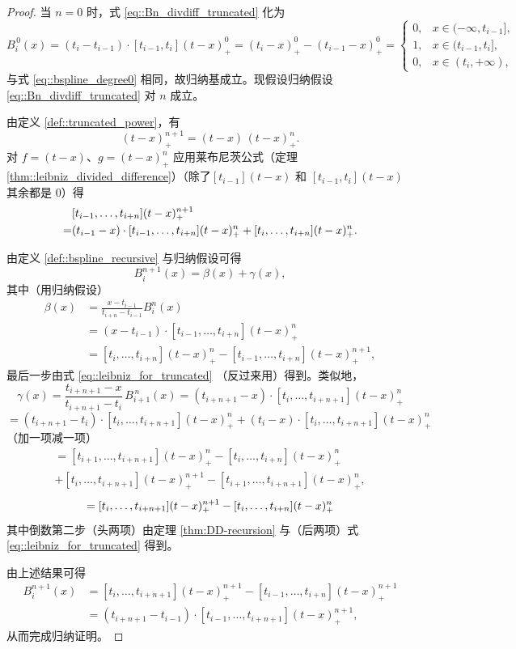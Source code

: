 \documentclass[a4paper]{ctexart}
\numberwithin{theorem}{section}
\numberwithin{equation}{section}
\numberwithin{figure}{section}
\numberwithin{remark}{section}
\begin{document}
\begin{proof}
当 $n=0$ 时，式 \eqref{eq::Bn_divdiff_truncated} 化为
\[
B^{\,0}_i(x)=(t_i-t_{i-1})\cdot [t_{i-1},t_i](t-x)^{0}_{+}
=(t_i-x)^{0}_{+}-(t_{i-1}-x)^{0}_{+}
=\begin{cases}
0, & x\in(-\infty,t_{i-1}],\\
1, & x\in(t_{i-1},t_i],\\
0, & x\in(t_i,+\infty),
\end{cases}
\]
与式 \eqref{eq::bspline_degree0} 相同，故归纳基成立。现假设归纳假设 \eqref{eq::Bn_divdiff_truncated} 对 $n$ 成立。

由定义 \ref{def::truncated_power}，有
\[
(t-x)^{n+1}_{+}=(t-x)\,(t-x)^{n}_{+}.
\]
对 $f=(t-x)$、$g=(t-x)^{n}_{+}$ 应用莱布尼茨公式（定理 \ref{thm::leibniz_divided_difference}）（除了$[t_{i-1}](t - x)$ 和 $[t_{i - 1}, t_i](t - x)$ 其余都是 $0$）得
\begin{equation}
\label{eq::leibniz_for_truncated}
\begin{aligned}
&\relax [t_{i-1},\ldots,t_{i+n}](t-x)^{n+1}_{+} \\
=&(t_{i-1}-x)\cdot [t_{i-1},\ldots,t_{i+n}](t-x)^{n}_{+}
+[t_i,\ldots,t_{i+n}](t-x)^{n}_{+}.    
\end{aligned}
\end{equation}

由定义 \ref{def::bspline_recursive} 与归纳假设可得
\[
B^{n+1}_i(x)=\beta(x)+\gamma(x),
\]
其中（用归纳假设）
\[
\begin{aligned}
\beta(x)&=\frac{x-t_{i-1}}{t_{i+n}-t_{i-1}}B^{n}_i(x) \\
&=(x-t_{i-1})\cdot [t_{i-1},\ldots,t_{i+n}](t-x)^{n}_{+} \\
&=[t_i,\ldots,t_{i+n}](t-x)^{n}_{+}-[t_{i-1},\ldots,t_{i+n}](t-x)^{n+1}_{+},    
\end{aligned}
\]
最后一步由式 \eqref{eq::leibniz_for_truncated} （反过来用）得到。类似地，
\[
\gamma(x)=\frac{t_{i+n+1}-x}{t_{i+n+1}-t_i}\,B^{\,n}_{i+1}(x)
=(t_{i+n+1}-x)\cdot [t_i,\ldots,t_{i+n+1}](t-x)^{n}_{+}
\]
\[
=(t_{i+n+1}-t_i)\cdot [t_i,\ldots,t_{i+n+1}](t-x)^{n}_{+}
+(t_i-x)\cdot [t_i,\ldots,t_{i+n+1}](t-x)^{n}_{+}
\]
（加一项减一项）
\[
\begin{aligned}
=[t_{i+1},\ldots,t_{i+n+1}](t-x)^{n}_{+}
-[t_i,\ldots,t_{i+n}](t-x)^{n}_{+} \\
+[t_i,\ldots,t_{i+n+1}](t-x)^{n+1}_{+}
-[t_{i+1},\ldots,t_{i+n+1}](t-x)^{n}_{+},    
\end{aligned}
\]
\[
=[t_i,\ldots,t_{i+n+1}](t-x)^{n+1}_{+}-[t_i,\ldots,t_{i+n}](t-x)^{n}_{+} \\
\]
其中倒数第二步（头两项）由定理 \ref{thm:DD-recursion} 与（后两项）式 \eqref{eq::leibniz_for_truncated} 得到。

由上述结果可得
\[
\begin{aligned}
B^{n+1}_i(x)&=[t_i,\ldots,t_{i+n+1}](t-x)^{n+1}_{+}
-[t_{i-1},\ldots,t_{i+n}](t-x)^{n+1}_{+} \\
&=(t_{i+n+1}-t_{i-1})\cdot [t_{i-1},\ldots,t_{i+n+1}](t-x)^{n+1}_{+},   
\end{aligned}
\]
从而完成归纳证明。
\end{proof}
\end{document}
